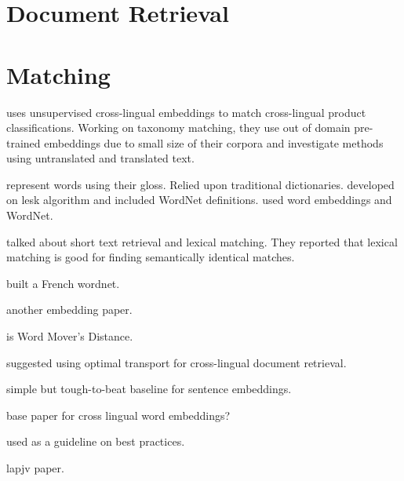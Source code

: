 \section{Document Retrieval}%
\label{sec:document_retrieval}

\section{Matching}%
\label{sec:matching}

\textcite{gordeev_unsupervised_2018} uses unsupervised cross-lingual embeddings to match cross-lingual product classifications.
Working on taxonomy matching, they use out of domain pre-trained embeddings due to small size of their corpora and investigate methods using untranslated and translated text.

\textcite{lesk_automatic_1986} represent words using their gloss. Relied upon traditional dictionaries.
\textcite{banerjee_adapted_2002} developed on lesk algorithm and included WordNet definitions.
\textcite{khodak_automated_2017} used word embeddings and WordNet.

\textcite{metzler_similarity_2007} talked about short text retrieval and lexical matching. They reported that lexical matching is good for finding semantically identical matches.

\textcite{sagot_building_2008} built a French wordnet.

\textcite{xiao_distributed_2014} another embedding paper.

\textcite{kusner_word_2015} is Word Mover's Distance.

\textcite{balikas_cross-lingual_2018} suggested using optimal transport for cross-lingual document retrieval.

\textcite{arora_simple_2016} simple but tough-to-beat baseline for sentence embeddings.

\textcite{klementiev_inducing_2012} base paper for cross lingual word embeddings?

\textcite{irvine_comprehensive_2017} used as a guideline on best practices.

\textcite{jonker_shortest_1987} lapjv paper.
